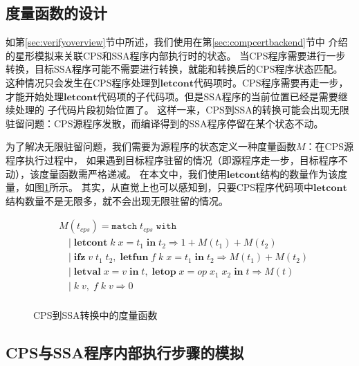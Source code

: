 \subsection{度量函数的设计}

如第\ref{sec:verifyoverview}节中所述，我们使用在第\ref{sec:compcertbackend}节中
介绍的星形模拟来关联CPS和SSA程序内部执行时的状态。
当CPS程序需要进行一步转换，目标SSA程序可能不需要进行转换，就能和转换后的CPS程序状态匹配。
这种情况只会发生在CPS程序处理到$\mathbf{letcont}$代码项时。CPS程序需要再走一步，
才能开始处理$\mathbf{letcont}$代码项的子代码项。但是SSA程序的当前位置已经是需要继续处理的
子代码片段初始位置了。
这样一来，CPS到SSA的转换可能会出现无限驻留问题：CPS源程序发散，而编译得到的SSA程序停留在某个状态不动。

为了解决无限驻留问题，我们需要为源程序的状态定义一种度量函数$M$：在CPS源程序执行过程中，
如果遇到目标程序驻留的情况（即源程序走一步，目标程序不动），该度量函数需严格递减。
在本文中，我们使用$\mathbf{letcont}$结构的数量作为该度量，如图\ref{fig:measure}所示。
其实，从直觉上也可以感知到，只要CPS程序代码项中$\mathbf{letcont}$结构数量不是无限多，就不会出现无限驻留的情况。

\begin{figure}[htbp]
    \centering
    \begin{equation}
    \nonumber
        \begin{aligned}
            & M(t_{cps}) = \mathtt{match}\; t_{cps}\; \mathtt{with} \\
            & \quad |\; \mathbf{letcont}\; k\; x=t_1\; \mathbf{in}\; t_2 \Rightarrow 1 + M(t_1) + M(t_2) \\
            & \quad |\; \mathbf{ifz}\; v\; t_1\; t_2,\; \mathbf{letfun}\; f\; k\; x=t_1\; \mathbf{in}\; t_2 \Rightarrow M(t_1) + M(t_2) \\
            & \quad |\; \mathbf{letval}\; x=v\; \mathbf{in}\; t,\; \mathbf{letop}\; x=op\; x_1\; x_2\; \mathbf{in}\; t \Rightarrow M(t)\\
            & \quad |\; k\; v,\; f\; k\; v \Rightarrow 0 \\
        \end{aligned}
    \end{equation}
    \caption{CPS到SSA转换中的度量函数}\label{fig:measure}
\end{figure}


\subsection{CPS与SSA程序内部执行步骤的模拟}

